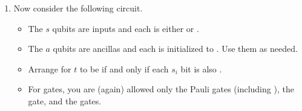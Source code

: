 \documentclass[12pt]{article}
\begin{document}
\begin{enumerate}[font=\bfseries]
\item{} Now consider the following circuit.
\begin{itemize}
    \item The $s$ qubits are inputs and each is either \QZero{} or \QOne{}.
    \item The $a$ qubits are ancillas and each is initialized to \QZero{}.  Use them as needed.
    \item Arrange for $t$ to be \QOne{} if and only if each $s_{i}$ bit is also \QOne{}.  
    \item For gates, you are (again) allowed only the
    Pauli gates (including \Hadamard{}), the  gate, and the  gates.
\end{itemize}
\begin{center}
\Vskip{-3em}
\end{center}


\end{enumerate}
\end{document}
